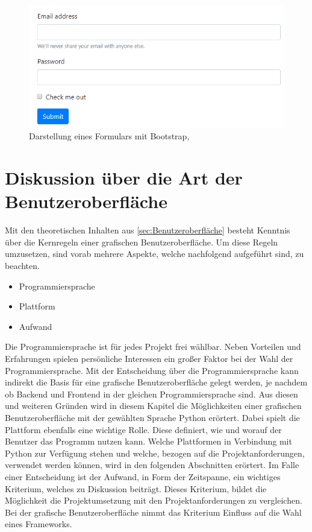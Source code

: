 \documentclass[a4paper,titlepage,halfparskip,12pt]{scrreprt}
\begin{document}
\begin{onehalfspacing}
\begin{figure}[h]
	\centering
	\includegraphics[scale=1.0]{images/BootstrapForm}
	\caption{Darstellung eines Formulars mit Bootstrap, \cite{bootstrapOnline}} 
	\label{img:BootstrapForm}
\end{figure}
\pagebreak

\chapter{Diskussion über die Art der Benutzeroberfläche}
\label{chap:DiskussionGUI}

Mit den theoretischen Inhalten aus \autoref{sec:Benutzeroberfläche} besteht Kenntnis über die Kernregeln einer grafischen Benutzeroberfläche. Um diese Regeln umzusetzen, sind vorab mehrere Aspekte, welche nachfolgend aufgeführt sind, zu beachten.
\begin{itemize}
	\item Programmiersprache
	\item Plattform
	\item Aufwand
\end{itemize}
Die Programmiersprache ist für jedes Projekt frei wählbar. Neben Vorteilen und Erfahrungen spielen persönliche Interessen ein großer Faktor bei der Wahl der Programmiersprache. Mit der Entscheidung über die Programmiersprache kann indirekt die Basis für eine grafische Benutzeroberfläche gelegt werden, je nachdem ob Backend und Frontend in der gleichen Programmiersprache sind. Aus diesen und weiteren Gründen wird in diesem Kapitel die Möglichkeiten einer grafischen Benutzeroberfläche mit der gewählten Sprache Python erörtert. Dabei spielt die Plattform ebenfalls eine wichtige Rolle. Diese definiert, wie und worauf der Benutzer das Programm nutzen kann. Welche Plattformen in Verbindung mit Python zur Verfügung stehen und welche, bezogen auf die Projektanforderungen, verwendet werden können, wird in den folgenden Abschnitten erörtert. Im Falle einer Entscheidung ist der Aufwand, in Form der Zeitspanne, ein wichtiges Kriterium, welches zu Diskussion beiträgt. Dieses Kriterium, bildet die Möglichkeit die Projektumsetzung mit den Projektanforderungen zu vergleichen. Bei der grafische Benutzeroberfläche nimmt das Kriterium Einfluss auf die Wahl eines Frameworks.


\end{onehalfspacing}
\end{document}
